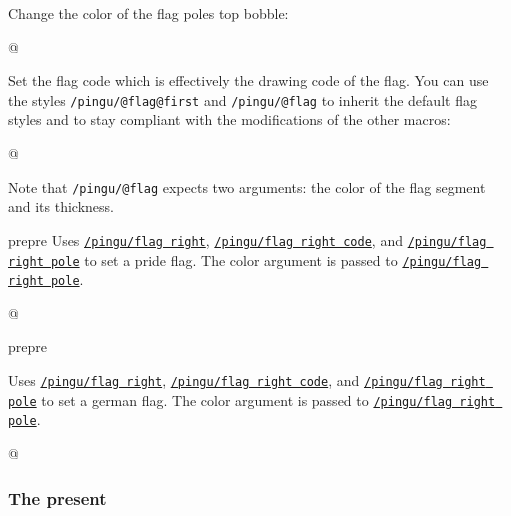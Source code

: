 \documentclass[parskip=half,english,numbers=noenddot,footnotes=nomultiple,oneside,fontsize=10pt,DIV=15,headinclude]{scrartcl}
\makeatletter
\def\pingu@listing@text{}
\def\lpingu#1{\begingroup\def\pingu@listing@text{#1}\lstinline[style=lstpingu,breakatwhitespace]'#1'\endgroup}
\def\@showcase@pre{pre}
\let\@showcase@cur\@showcase@pre
\def\@toggle@showcase{\ifx\@showcase@cur\@showcase@pre\global\let\@showcase@cur\@empty\else \global\let\@showcase@cur\@showcase@pre\fi}
\newcommand*\keyref[2][/pingu/]{\hyperref[pk:#1#2]{\lpingu{#1#2}}}
\makeatother
\begin{document}
{{{{
Change the color of the flag poles top bobble:
	\begin{tcblisting}{@}
\begin{tikzpicture}
	\pingu[flag right, flag right bobble=green]
\end{tikzpicture}
\end{tcblisting}
\endsubkeyexplain

Set the flag code which is effectively the drawing code of the flag.
You can use the styles \lpingu{/pingu/@flag@first} and \lpingu{/pingu/@flag} to inherit the default flag styles and to stay compliant with the modifications of the other macros:
	\begin{tcblisting}{@}
\begin{tikzpicture}
	\pingu[flag right, flag right code={
	  \node[/pingu/@flag@first,
	  	/pingu/@flag={blue}{5mm}]
	  		(upper) at (0,0) {};
	  \node[below,/pingu/@flag={black}{4mm}]
	  	(lower) at (upper.south) {};
	}]
\end{tikzpicture}
\end{tcblisting}
Note that \lpingu{/pingu/@flag} expects two arguments: the color of the flag segment and its thickness.
\endsubkeyexplain

\@toggle@showcase %
	Uses \keyref{flag right}, \keyref{flag right code}, and \keyref{flag right pole} to set a pride flag. The color argument is passed to \keyref{flag right pole}.
\begin{tcblisting}{@}
\begin{tikzpicture}
	\pingu[pride flag right=green]
\end{tikzpicture}
\end{tcblisting}
\endshowkeyexplain
\@toggle@showcase

	Uses \keyref{flag right}, \keyref{flag right code}, and \keyref{flag right pole} to set a german flag. The color argument is passed to \keyref{flag right pole}.
\begin{tcblisting}{@}
\begin{tikzpicture}
	\pingu[german flag right=green]
\end{tikzpicture}
\end{tcblisting}
\endshowkeyexplain

\subsubsection{The present}

}}}}
\end{document}
